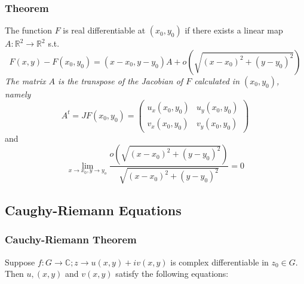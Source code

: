 \documentclass[a4paper, 12pt, twoside]{article}
\begin{document}
                \subsubsection{Theorem}
                    The function $F$ is real differentiable at $(x_{0},y_{0})$ if there exists a linear map $A:\mathbb{R}^{2} \to  \mathbb{R}^{2}$ s.t.
                    $$F(x,y)-F(x_{0},y_{0})=(x-x_{0},y-y_{0})A+o(\sqrt{(x-x_{0})^{2}+(y-y_{0})^{2}})$$
                    \textit{The matrix $A$ is the transpose of the Jacobian of $F$ calculated in $(x_{0},y_{0})$, namely}
                    $$A^{t}=JF(x_{0},y_{0})=
                    \begin{pmatrix}
                            u_{x}(x_{0},y_{0}) & u_{y}(x_{0},y_{0})\\
                            v_{x}(x_{0},y_{0}) & v_{y}(x_{0},y_{0})
                    \end{pmatrix}$$
                    and
                    $$\lim_{x\to x_{0},y\to y_{o}}\frac{o(\sqrt{(x-x_{0})^{2}+(y-y_{0})^{2}})}{\sqrt{(x-x_{0})^{2}+(y-y_{0})^{2}}}=0 $$

            \newpage
            \subsection{Caughy-Riemann Equations}
                \subsubsection{Cauchy-Riemann Theorem}
                    Suppose $f:G \to  \mathbb{C};z\to u(x,y)+iv(x,y)$ is complex differentiable in $z_{0}\in G$. Then $u,(x,y)$ and $v(x,y)$ satisfy the following equations:
                    $$ $$
\end{document}
